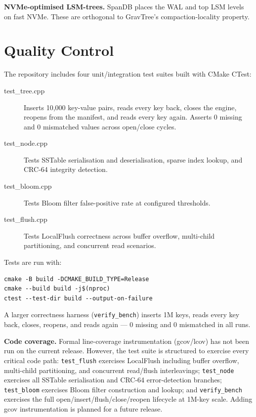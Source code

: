 \documentclass{jors}
\begin{document}
\textbf{NVMe-optimised LSM-trees.} SpanDB \citep{spandb} places the WAL
and top LSM levels on fast NVMe. These are orthogonal to GravTree's
compaction-locality property.

\section*{Quality Control}

The repository includes four unit/integration test suites built with
CMake CTest:

\begin{description}
  \item[test\_tree.cpp] Inserts 10,000 key-value pairs, reads every key
    back, closes the engine, reopens from the manifest, and reads every
    key again. Asserts 0 missing and 0 mismatched values across
    open/close cycles.
  \item[test\_node.cpp] Tests SSTable serialisation and deserialisation,
    sparse index lookup, and CRC-64 integrity detection.
  \item[test\_bloom.cpp] Tests Bloom filter false-positive rate at
    configured thresholds.
  \item[test\_flush.cpp] Tests LocalFlush correctness across buffer
    overflow, multi-child partitioning, and concurrent read scenarios.
\end{description}

Tests are run with:
\begin{verbatim}
cmake -B build -DCMAKE_BUILD_TYPE=Release
cmake --build build -j$(nproc)
ctest --test-dir build --output-on-failure
\end{verbatim}

A larger correctness harness (\texttt{verify\_bench}) inserts 1M keys,
reads every key back, closes, reopens, and reads again — 0 missing and 0
mismatched in all runs.

\textbf{Code coverage.} Formal line-coverage instrumentation (gcov/lcov)
has not been run on the current release. However, the test suite is
structured to exercise every critical code path: \texttt{test\_flush}
exercises LocalFlush including buffer overflow, multi-child partitioning,
and concurrent read/flush interleavings; \texttt{test\_node} exercises
all SSTable serialisation and CRC-64 error-detection branches;
\texttt{test\_bloom} exercises Bloom filter construction and lookup; and
\texttt{verify\_bench} exercises the full open/insert/flush/close/reopen
lifecycle at 1M-key scale. Adding gcov instrumentation is planned for a
future release.
\end{document}
